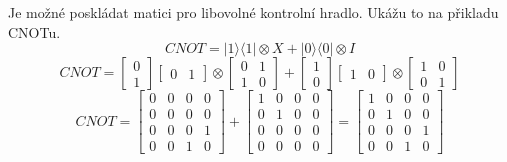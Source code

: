 \documentclass[11pt]{article}
\begin{document}
\par Je možné poskládat matici pro libovolné kontrolní hradlo. Ukážu to na přikladu CNOTu.
$$CNOT = |1 \rangle\langle 1| \otimes X + |0 \rangle\langle 0| \otimes I$$
$$CNOT = \begin{bmatrix}
        0 \\
        1
    \end{bmatrix}\begin{bmatrix}
        0 & 1
    \end{bmatrix} \otimes \begin{bmatrix}
        0 & 1 \\
        1 & 0
    \end{bmatrix} + \begin{bmatrix}
        1 \\
        0
    \end{bmatrix}\begin{bmatrix}
        1 & 0
    \end{bmatrix} \otimes \begin{bmatrix}
        1 & 0 \\
        0 & 1
    \end{bmatrix}$$
$$CNOT = \begin{bmatrix}
        0 & 0 & 0 & 0 \\
        0 & 0 & 0 & 0 \\
        0 & 0 & 0 & 1 \\
        0 & 0 & 1 & 0
    \end{bmatrix} + \begin{bmatrix}
        1 & 0 & 0 & 0 \\
        0 & 1 & 0 & 0 \\
        0 & 0 & 0 & 0 \\
        0 & 0 & 0 & 0
    \end{bmatrix} = \begin{bmatrix}
        1 & 0 & 0 & 0 \\
        0 & 1 & 0 & 0 \\
        0 & 0 & 0 & 1 \\
        0 & 0 & 1 & 0
    \end{bmatrix}$$
\end{document}
